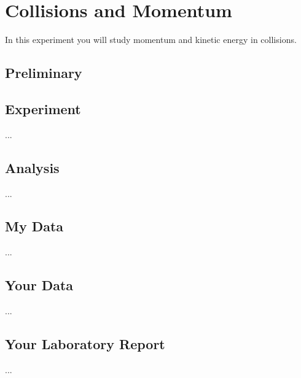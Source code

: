 \setcounter{chapter}{9}
\chapter{Collisions and Momentum}
In this experiment you will study momentum and kinetic energy in collisions.
\section{Preliminary}

\section{Experiment}
...
\section{Analysis}
...
\section{My Data}
...
\section{Your Data}
...
\newpage
\section{Your Laboratory Report}
...
\newpage
